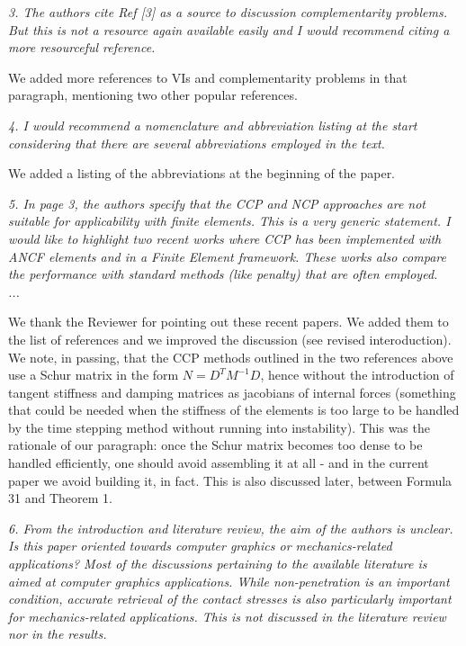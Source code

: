 \documentclass[final,12pt]{article}
\def\reviewercomment#1{{\vskip4mm \color{mycommentcolor} \textit{#1} \vskip2mm}}
\begin{document}
\reviewercomment{
3. The authors cite Ref [3] as a source to discussion complementarity problems. But this is not a
resource again available easily and I would recommend citing a more resourceful reference.
}

We added more references to VIs and complementarity problems in that paragraph, mentioning two other popular references. 


\reviewercomment{
4. I would recommend a nomenclature and abbreviation listing at the start considering that there
are several abbreviations employed in the text.
}

We added a listing of the abbreviations at the beginning of the paper. 


\reviewercomment{
5. In page 3, the authors specify that the CCP and NCP approaches are not suitable for
applicability with finite elements. This is a very generic statement. I would like to highlight two
recent works where CCP has been implemented with ANCF elements and in a Finite Element
framework. These works also compare the performance with standard methods (like penalty)
that are often employed. \\
...
}

We thank the Reviewer for pointing out these recent papers. We added them to the list of references and we improved the discussion (see revised interoduction). 
We note, in passing, that the CCP methods outlined in the two references above use a Schur matrix in the form $N=D^TM^{-1}D$, hence without the introduction of tangent stiffness and damping matrices as jacobians of internal forces (something that could be needed when the stiffness of the elements is too large to be handled by the time stepping method without running into instability). This was the rationale of our paragraph: once the Schur matrix becomes too dense to be handled efficiently, one should avoid assembling it at all - and in the current paper we avoid building it, in fact. This is also discussed later, between Formula 31 and Theorem 1.   


\reviewercomment{
6. From the introduction and literature review, the aim of the authors is unclear. Is this paper
oriented towards computer graphics or mechanics-related applications? Most of the
discussions pertaining to the available literature is aimed at computer graphics applications.
While non-penetration is an important condition, accurate retrieval of the contact stresses is
also particularly important for mechanics-related applications. This is not discussed in the
literature review nor in the results.
}
\end{document}
